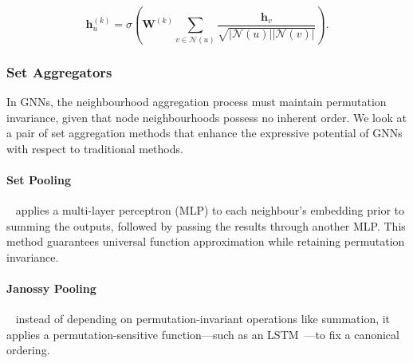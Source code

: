 \begin{equation*}
    \mathbf{h}_u^{(k)} = \sigma\left(\mathbf{W}^{(k)}\sum_{v \in \mathcal{N}(u)}\frac{ \mathbf{h}_v}{\sqrt{|\mathcal{N}(u)||\mathcal{N}(v)|}}\right).
\end{equation*}

\subsubsection{Set Aggregators}
In GNNs, the neighbourhood aggregation process must maintain permutation invariance, given that node neighbourhoods possess no inherent order. We look at a pair of set aggregation methods that enhance the expressive potential of GNNs with respect to traditional methods. 

\paragraph{Set Pooling}~\cite{zaheer2017deepSets} applies a multi-layer perceptron (MLP) to each neighbour’s embedding prior to summing the outputs, followed by passing the results through another MLP. This method guarantees universal function approximation while retaining permutation invariance. 

\paragraph{Janossy Pooling}~\cite{murphy2018janossyPooling} instead of depending on permutation-invariant operations like summation, it applies a permutation-sensitive function—such as an LSTM~\cite{hochreiter1997LSTM}—to fix a canonical ordering.

